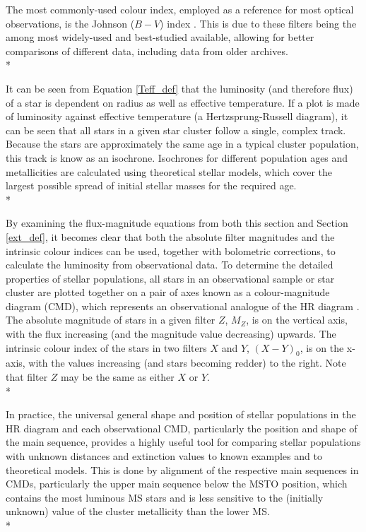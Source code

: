 \documentclass[12pt, a4paper]{report}
\begin{document}
The most commonly-used colour index, employed as a reference for most optical observations, is the Johnson ($B-V$) index \citep{1953ApJ...117..313J}. This is due to these filters being the among most widely-used and best-studied available, allowing for better comparisons of different data, including data from older archives.\\*

It can be seen from Equation \ref{Teff_def} that the luminosity (and therefore flux) of a star is dependent on radius as well as effective temperature. If a plot is made of luminosity against effective temperature (a Hertzsprung-Russell diagram), it can be seen that all stars in a given star cluster follow a single, complex track. Because the stars are approximately the same age in a typical cluster population, this track is know as an isochrone. Isochrones for different population ages and metallicities are calculated using theoretical stellar models, which cover the largest possible spread of initial stellar masses for the required age.\\*

By examining the flux-magnitude equations from both this section and Section \ref{ext_def}, it becomes clear that both the absolute filter magnitudes and the intrinsic colour indices can be used, together with bolometric corrections, to calculate the luminosity from observational data. To determine the detailed properties of stellar populations, all stars in an observational sample or star cluster are plotted together on a pair of axes known as a colour-magnitude diagram (CMD), which represents an observational analogue of the HR diagram \citep{2005ARA&A..43..293B}. The absolute magnitude of stars in a given filter $Z$, $M_{Z}$, is on the vertical axis, with the flux increasing (and the magnitude value decreasing) upwards. The intrinsic colour index of the stars in two filters $X$ and $Y$, $(X-Y)_{0}$, is on the x-axis, with the values increasing (and stars becoming redder) to the right. Note that filter $Z$ may be the same as either $X$ or $Y$.\\*

In practice, the universal general shape and position of stellar populations in the HR diagram and each observational CMD, particularly the position and shape of the main sequence, provides a highly useful tool for comparing stellar populations with unknown distances and extinction values to known examples and to theoretical models. This is done by alignment of the respective main sequences in CMDs, particularly the upper main sequence below the MSTO position, which contains the most luminous MS stars and is less sensitive to the (initially unknown) value of the cluster metallicity than the lower MS. \\*
\end{document}
